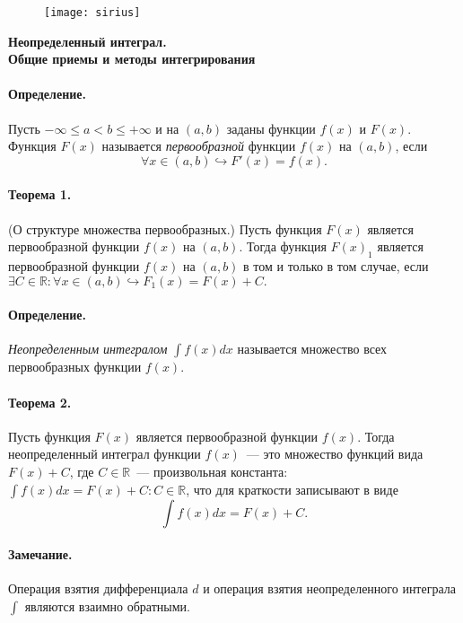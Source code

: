 \documentclass[a4paper,12pt]{article} %
\begin{document}

\begin{figure}[h!]
	\hfill
	\texttt{[image: sirius]}
\end{figure}
\vspace{5ex}
\begin{center}
	\Large\textbf{Неопределенный интеграл.\\
		Общие приемы и методы интегрирования} 
\end{center}

\paragraph*{Определение.}Пусть 
$ -\infty\leqslant a<b\leqslant+\infty $ и на $ (a, b) $
заданы функции $ f(x) $ и $ F(x) $. Функция $ F(x) $
называется \textit{первообразной} функции $ f(x) $ на 
$ (a, b) $, если
\[
	\forall x\in(a, b)\hookrightarrow F'(x)=f(x).
\] 
\paragraph{Теорема 1.}(О структуре множества первообразных.)
Пусть функция $ F(x) $ является первообразной функции 
$ f(x) $ на $ (a, b) $. Тогда функция $ F(x)_1 $ является
первообразной функции $ f(x) $ на $ (a, b) $ в том и только
в том случае, если 
$ \exists C\in\mathbb{R}: \forall x\in(a, b)
\hookrightarrow F_1(x)=F(x)+C.$
\paragraph{Определение.}\textit{Неопределенным интегралом}
$ \displaystyle\int f(x)dx $ называется множество всех первообразных 
функции $ f(x) $.
\paragraph{Теорема 2.}Пусть функция $ F(x) $ является 
первообразной функции $ f(x) $. Тогда неопределенный 
интеграл функции $ f(x) $~--- это множество функций вида
$ F(x)+C $, где $ C\in\mathbb{R} $~--- произвольная константа:
$ \int f(x)dx={F(x)+C:C\in\mathbb{R}} $, что для краткости
записывают в виде
\begin{equation}
	\int f(x)dx=F(x)+C.
\end{equation}
\paragraph{Замечание.} Операция взятия дифференциала $ d $
и операция взятия неопределенного интеграла 
$ \displaystyle\int $ являются взаимно обратными.
\end{document}
